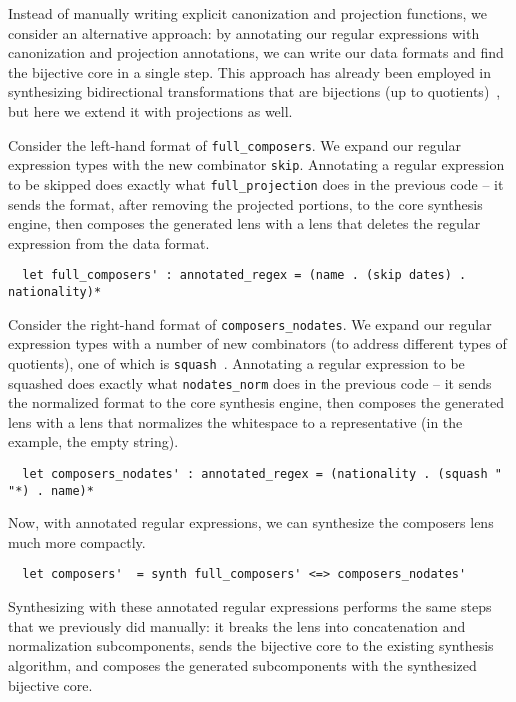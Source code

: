\documentclass[a4paper]{article}
\begin{document}
Instead of manually writing explicit canonization and projection functions, we
consider an alternative approach: by annotating our regular expressions with
canonization and projection annotations, we can write our data formats and find
the bijective core in a single step. This approach has already been employed in
synthesizing bidirectional transformations that are bijections (up to
quotients)~\cite{maina+:quotient-synthesis}, but here we extend it with projections as well.

Consider the left-hand format of \lstinline{full_composers}. We expand our
regular expression types with the new combinator \lstinline{skip}. Annotating a
regular expression to be skipped does exactly what \lstinline{full_projection}
does in the previous code -- it sends the format, after removing the projected
portions, to the core synthesis engine, then composes the generated lens with a
lens that deletes the regular expression from the data format.
%
\begin{lstlisting}
  let full_composers' : annotated_regex = (name . (skip dates) . nationality)*
\end{lstlisting}
%

Consider the right-hand format of \lstinline{composers_nodates}. We expand our
regular expression types with a number of new combinators (to address different
types of quotients), one of which is
\lstinline{squash}~\cite{maina+:quotient-synthesis}. Annotating a regular
expression to be squashed does exactly what \lstinline{nodates_norm} does in the
previous code -- it sends the normalized format to the core synthesis engine,
then composes the generated lens with a lens that normalizes the whitespace to a
representative (in the example, the empty string).
%
\begin{lstlisting}
  let composers_nodates' : annotated_regex = (nationality . (squash " "*) . name)*
\end{lstlisting}
%

Now, with annotated regular expressions, we can synthesize the composers lens much
more compactly.
%
\begin{lstlisting}
  let composers'  = synth full_composers' <=> composers_nodates'
\end{lstlisting}
%
Synthesizing with these annotated regular expressions performs the same steps
that we previously did manually: it breaks the lens into concatenation and
normalization subcomponents, sends the bijective core to the existing synthesis
algorithm, and composes the generated subcomponents with the synthesized
bijective core.
\end{document}
